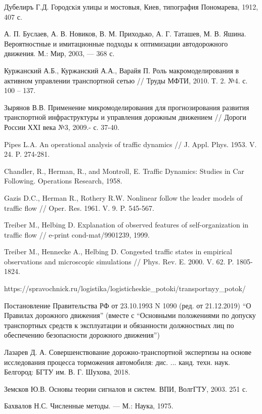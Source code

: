 \documentclass[12pt, a4paper]{extarticle}
\numberwithin{equation}{section}
\numberwithin{figure}{section}
\begin{document}
\begin{thebibliography}{**}
	Дубелиръ Г.Д. Городскiя улицы и мостовыя, Киев, типография Пономарева, 1912, 407 с.
	
	А. П. Буслаев, А. В. Новиков, В. М. Приходько, А. Г. Таташев, М. В. Яшина. Вероятностные и имитационные подходы к оптимизации автодорожного движения. М.: Мир, 2003, — 368 с. 
	
	Куржанский А.Б., Куржанский А.А., Варайя П. Роль макромоделирования в активном
	управлении транспортной сетью // Труды МФТИ, 2010. Т. 2. №4. с. 100 – 137.
	
	Зырянов В.В. Применение микромоделирования для прогнозирования развития транспортной инфраструктуры и управления дорожным движением // Дороги России ХХI века №3, 2009.- с. 37-40.
	
	Pipes L.A. An operational analysis of traffic
 dynamics // J. Appl. Phys. 1953. V. 24.
	P. 274-281.
	
	Chandler, R., Herman, R., and Montroll, E. Traffic Dynamics: Studies in Car Following. Operations Research, 1958. 
	
	Gazis D.C., Herman R., Rothery R.W. Nonlinear follow the leader models of traffic
flow //
	Oper. Res. 1961. V. 9. P. 545-567.
	
	Treiber M., Helbing D. Explanation of observed features of self-organization in traffic flow // e-print cond-mat/9901239, 1999.
	
	Treiber M., Hennecke A., Helbing D. Congested traffic states in empirical observations and
	microscopic simulations // Phys. Rev. E. 2000. V. 62. P. 1805-1824.
			
	https://spravochnick.ru/logistika/logisticheskie\_potoki/transportnyy\_potok/
	
	Постановление Правительства РФ от 23.10.1993 N 1090 (ред. от 21.12.2019) ``О Правилах дорожного движения'' (вместе с ``Основными положениями по допуску транспортных средств к эксплуатации и обязанности должностных лиц по обеспечению безопасности дорожного движения'')

	Лазарев Д. А. Совершенствование дорожно-транспортной экспертизы на основе исследования процесса торможения автомобиля: дис. ... канд. техн. наук. Белгород: БГТУ им. В. Г. Шухова, 2018.

	Земсков Ю.В. Основы теории сигналов и систем. ВПИ, ВолгГТУ, 2003. 251 с.
	
	Бахвалов Н.С. Численные методы. --- М.: Наука, 1975. 
\end{thebibliography}
\end{document}
